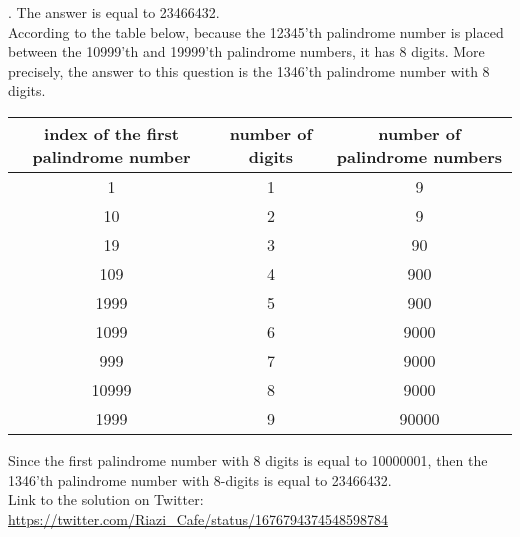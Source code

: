 \begin{solution}.
The answer is equal to 23466432.\\[0.2cm]

According to the table below, because the 12345'th palindrome number is placed between the 10999'th and 19999'th palindrome numbers, it has 8 digits. More precisely, the answer to this question is the 1346'th palindrome number with 8 digits.

\begin{center}
\begin{tabular}{|c|c|c|}
\hline
 index of the first palindrome number &  number of digits &  number of palindrome numbers \\
\hline
1  & 1 &  9 \\
\hline
10 & 2 & 9 \\
\hline
19 & 3 & 90 \\
\hline
109 & 4 & 900\\
\hline
1999 & 5 & 900\\
\hline
1099 & 6 & 9000\\
\hline
999 & 7 & 9000 \\
\hline
10999 & 8 & 9000\\
\hline
1999 & 9 & 90000\\
\hline
\end{tabular}
\end{center}

Since the first palindrome number with 8 digits is equal to 10000001, then the 1346'th palindrome number with 8-digits is equal to 23466432.\\[0.2cm]

Link to the solution on Twitter:  \url{https://twitter.com/Riazi_Cafe/status/1676794374548598784}\end{solution}